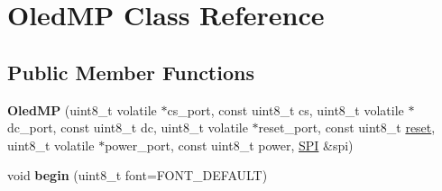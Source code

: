 \hypertarget{class_oled_m_p}{\section{Oled\-M\-P Class Reference}
\label{class_oled_m_p}
}
\subsection*{Public Member Functions}
\begin{DoxyCompactItemize}
\item 
\hypertarget{class_oled_m_p_a28d0d43a1a47653e1895af615579eeab}{{\bfseries Oled\-M\-P} (uint8\-\_\-t volatile $\ast$cs\-\_\-port, const uint8\-\_\-t cs, uint8\-\_\-t volatile $\ast$dc\-\_\-port, const uint8\-\_\-t dc, uint8\-\_\-t volatile $\ast$reset\-\_\-port, const uint8\-\_\-t \hyperlink{class_oled_m_p_ad20897c5c8bd47f5d4005989bead0e55}{reset}, uint8\-\_\-t volatile $\ast$power\-\_\-port, const uint8\-\_\-t power, \hyperlink{class_s_p_i}{S\-P\-I} \&spi)}\label{class_oled_m_p_a28d0d43a1a47653e1895af615579eeab}

\item 
\hypertarget{class_oled_m_p_a4eb052247c935a88f6e9428266b51077}{void {\bfseries begin} (uint8\-\_\-t font=F\-O\-N\-T\-\_\-\-D\-E\-F\-A\-U\-L\-T)}\label{class_oled_m_p_a4eb052247c935a88f6e9428266b51077}


\end{DoxyCompactItemize}
